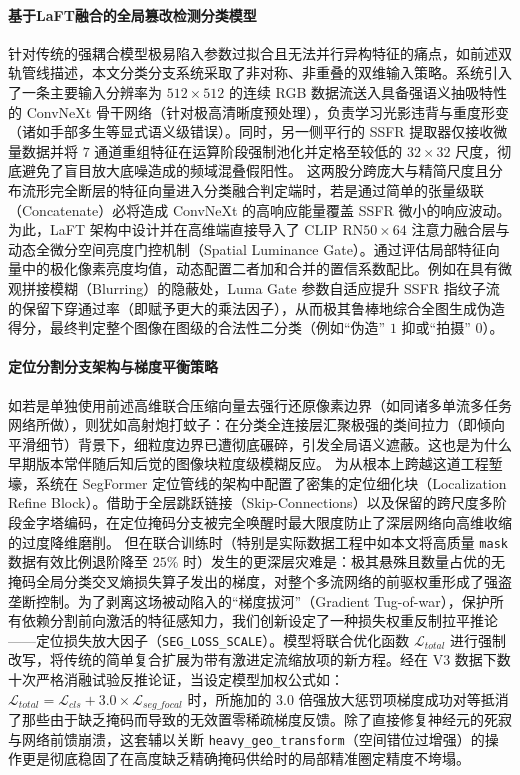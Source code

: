 \documentclass[10pt,a4paper,twocolumn]{ctexart}
\begin{document}
\paragraph{基于LaFT融合的全局篡改检测分类模型}
针对传统的强耦合模型极易陷入参数过拟合且无法并行异构特征的痛点，如前述双轨管线描述，本文分类分支系统采取了非对称、非重叠的双维输入策略。系统引入了一条主要输入分辨率为 $512 \times 512$ 的连续 RGB 数据流送入具备强语义抽吸特性的 ConvNeXt 骨干网络（针对极高清晰度预处理），负责学习光影违背与重度形变（诸如手部多生等显式语义级错误）。同时，另一侧平行的 SSFR 提取器仅接收微量数据并将 $7$ 通道重组特征在运算阶段强制池化并定格至较低的 $32 \times 32$ 尺度，彻底避免了盲目放大底噪造成的频域混叠假阳性。
这两股分跨庞大与精简尺度且分布流形完全断层的特征向量进入分类融合判定端时，若是通过简单的张量级联（Concatenate）必将造成 ConvNeXt 的高响应能量覆盖 SSFR 微小的响应波动。为此，LaFT 架构中设计并在高维端直接导入了 CLIP $\text{RN50}\times 64$ 注意力融合层与动态全微分空间亮度门控机制（Spatial Luminance Gate）。通过评估局部特征向量中的极化像素亮度均值，动态配置二者加和合并的置信系数配比。例如在具有微观拼接模糊（Blurring）的隐蔽处，Luma Gate 参数自适应提升 SSFR 指纹子流的保留下穿通过率（即赋予更大的乘法因子），从而极其鲁棒地综合全图生成伪造得分，最终判定整个图像在图级的合法性二分类（例如“伪造” $1$ 抑或“拍摄” $0$）。

\paragraph{定位分割分支架构与梯度平衡策略}
如若是单独使用前述高维联合压缩向量去强行还原像素边界（如同诸多单流多任务网络所做），则犹如高射炮打蚊子：在分类全连接层汇聚极强的类间拉力（即倾向平滑细节）背景下，细粒度边界已遭彻底碾碎，引发全局语义遮蔽。这也是为什么早期版本常伴随后知后觉的图像块粒度级模糊反应。
为从根本上跨越这道工程堑壕，系统在 SegFormer 定位管线的架构中配置了密集的定位细化块（Localization Refine Block）。借助于全层跳跃链接（Skip-Connections）以及保留的跨尺度多阶段金字塔编码，在定位掩码分支被完全唤醒时最大限度防止了深层网络向高维收缩的过度降维磨削。
但在联合训练时（特别是实际数据工程中如本文将高质量 \texttt{mask} 数据有效比例退阶降至 $25\%$ 时）发生的更深层灾难是：极其悬殊且数量占优的无掩码全局分类交叉熵损失算子发出的梯度，对整个多流网络的前驱权重形成了强盗垄断控制。为了剥离这场被动陷入的“梯度拔河”（Gradient Tug-of-war），保护所有依赖分割前向激活的特征感知力，我们创新设定了一种损失权重反制拉平推论——定位损失放大因子（\texttt{SEG\_LOSS\_SCALE}）。模型将联合优化函数 $\mathcal{L}_{total}$ 进行强制改写，将传统的简单复合扩展为带有激进定流缩放项的新方程。经在 V3 数据下数十次严格消融试验反推论证，当设定模型加权公式如：$\mathcal{L}_{total} = \mathcal{L}_{cls} + 3.0 \times \mathcal{L}_{seg\_focal}$ 时，所施加的 $3.0$ 倍强放大惩罚项梯度成功对等抵消了那些由于缺乏掩码而导致的无效置零稀疏梯度反馈。除了直接修复神经元的死寂与网络前馈崩溃，这套辅以关断 \texttt{heavy\_geo\_transform}（空间错位过增强）的操作更是彻底稳固了在高度缺乏精确掩码供给时的局部精准圈定精度不垮塌。
\end{document}
